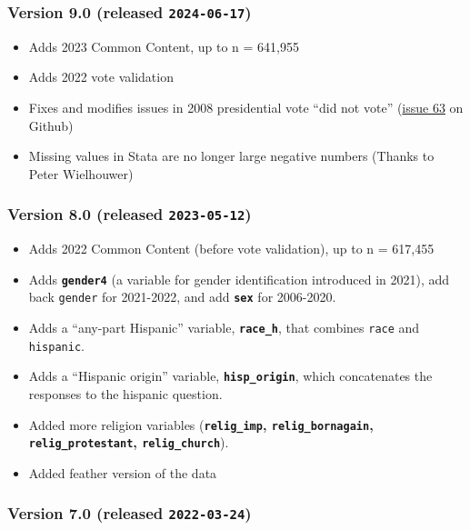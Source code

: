 \documentclass[10pt,article,oneside]{memoir}
\begin{document}
\subsubsection{\texorpdfstring{Version 9.0 (released
\texttt{2024-06-17})}{Version 9.0 (released 2024-06-17)}}\label{version-9.0-released-2024-06-17}

\begin{itemize}
\tightlist
\item
  Adds 2023 Common Content, up to n = 641,955
\item
  Adds 2022 vote validation
\item
  Fixes and modifies issues in 2008 presidential vote ``did not vote''
  (\href{https://github.com/kuriwaki/cces_cumulative/issues/63}{issue
  63} on Github)
\item
  Missing values in Stata are no longer large negative numbers (Thanks
  to Peter Wielhouwer)
\end{itemize}

\subsubsection{\texorpdfstring{Version 8.0 (released
\texttt{2023-05-12})}{Version 8.0 (released 2023-05-12)}}\label{version-8.0-released-2023-05-12}

\begin{itemize}
\tightlist
\item
  Adds 2022 Common Content (before vote validation), up to n = 617,455
\item
  Adds \textbf{\texttt{gender4}} (a variable for gender identification
  introduced in 2021), add back \texttt{gender} for 2021-2022, and add
  \textbf{\texttt{sex}} for 2006-2020.
\item
  Adds a ``any-part Hispanic'' variable, \textbf{\texttt{race\_h}}, that
  combines \texttt{race} and \texttt{hispanic}.
\item
  Adds a ``Hispanic origin'' variable, \textbf{\texttt{hisp\_origin}},
  which concatenates the responses to the hispanic question.
\item
  Added more religion variables (\textbf{\texttt{relig\_imp},
  \texttt{relig\_bornagain}, \texttt{relig\_protestant},
  \texttt{relig\_church}}).
\item
  Added feather version of the data
\end{itemize}

\subsubsection{\texorpdfstring{Version 7.0 (released
\texttt{2022-03-24})}{Version 7.0 (released 2022-03-24)}}\label{version-7.0-released-2022-03-24}
\end{document}
